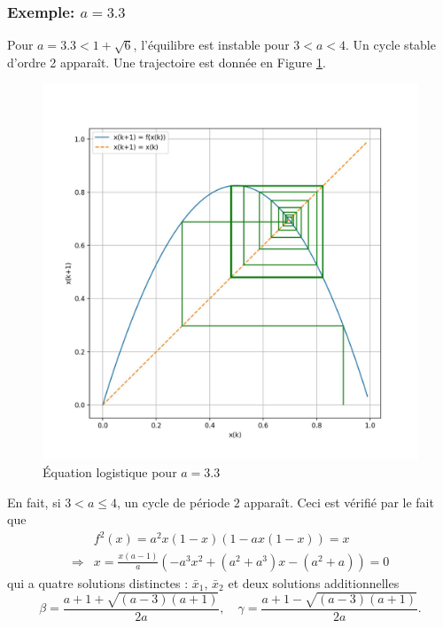             \subsubsection{Exemple: $a = 3.3$}
                Pour $a = 3.3 < 1 + \sqrt{6}$, l’équilibre est instable pour $3 < a < 4$.
                Un cycle stable d’ordre 2 apparaît. Une trajectoire est donnée en Figure \ref{fig:logistique_differences_6}.
                \begin{figure}[ht!]
                    \centering
                    \includegraphics[width=\textwidth]{images/logistique_differences_6.jpg}
                    \caption{Équation logistique pour $a=3.3$}
                    \label{fig:logistique_differences_6}
                \end{figure}
            
                En fait, si $3 < a \leq 4$, un cycle de période $2$ apparaît. Ceci est vérifié par le fait que
                \begin{equation}
                    \begin{split}
                        &f^2(x) = a^2 x(1 - x)(1 - ax(1 - x)) = x \\
                        \Rightarrow& x = \frac{x(a - 1)}{a} \left( -a^3 x^2 + (a^2 + a^3)x - (a^2 + a) \right) = 0
                    \end{split}
                \end{equation}
                qui a quatre solutions distinctes : $\bar{x}_1$, $\bar{x}_2$ et deux solutions additionnelles
                \begin{equation}
                    \beta = \frac{a + 1 + \sqrt{(a - 3)(a + 1)}}{2a}, \quad \gamma = \frac{a + 1 - \sqrt{(a - 3)(a + 1)}}{2a}.
                \end{equation}